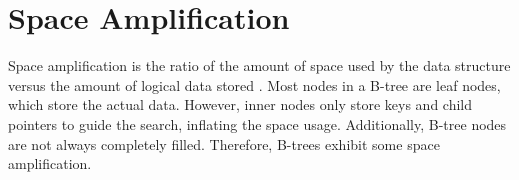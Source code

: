 \section{Space Amplification}
Space amplification is the ratio of the amount of space used by the data structure versus the amount of logical data stored \cite{kuszmaul2014fractal}.
Most nodes in a B-tree are leaf nodes, which store the actual data.
However, inner nodes only store keys and child pointers to guide the search, inflating the space usage.
Additionally, B-tree nodes are not always completely filled.
Therefore, B-trees exhibit some space amplification.